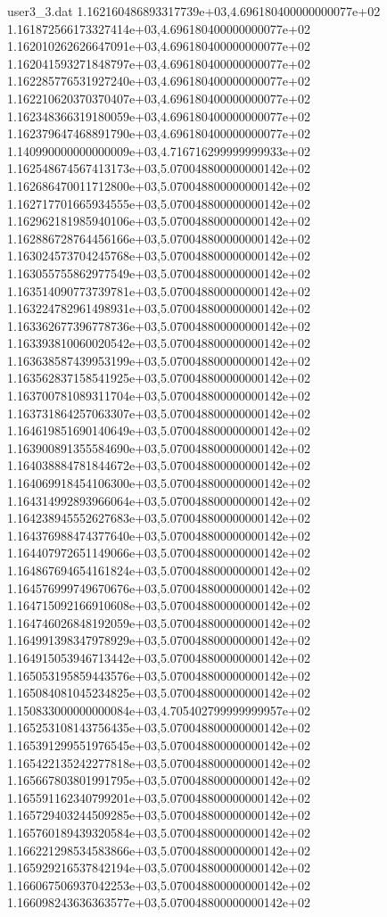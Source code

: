\begin{filecontents}{user3_3.dat}
1.162160486893317739e+03,4.696180400000000077e+02
1.161872566173327414e+03,4.696180400000000077e+02
1.162010262626647091e+03,4.696180400000000077e+02
1.162041593271848797e+03,4.696180400000000077e+02
1.162285776531927240e+03,4.696180400000000077e+02
1.162210620370370407e+03,4.696180400000000077e+02
1.162348366319180059e+03,4.696180400000000077e+02
1.162379647468891790e+03,4.696180400000000077e+02
1.140990000000000009e+03,4.716716299999999933e+02
1.162548674567413173e+03,5.070048800000000142e+02
1.162686470011712800e+03,5.070048800000000142e+02
1.162717701665934555e+03,5.070048800000000142e+02
1.162962181985940106e+03,5.070048800000000142e+02
1.162886728764456166e+03,5.070048800000000142e+02
1.163024573704245768e+03,5.070048800000000142e+02
1.163055755862977549e+03,5.070048800000000142e+02
1.163514090773739781e+03,5.070048800000000142e+02
1.163224782961498931e+03,5.070048800000000142e+02
1.163362677396778736e+03,5.070048800000000142e+02
1.163393810060020542e+03,5.070048800000000142e+02
1.163638587439953199e+03,5.070048800000000142e+02
1.163562837158541925e+03,5.070048800000000142e+02
1.163700781089311704e+03,5.070048800000000142e+02
1.163731864257063307e+03,5.070048800000000142e+02
1.164619851690140649e+03,5.070048800000000142e+02
1.163900891355584690e+03,5.070048800000000142e+02
1.164038884781844672e+03,5.070048800000000142e+02
1.164069918454106300e+03,5.070048800000000142e+02
1.164314992893966064e+03,5.070048800000000142e+02
1.164238945552627683e+03,5.070048800000000142e+02
1.164376988474377640e+03,5.070048800000000142e+02
1.164407972651149066e+03,5.070048800000000142e+02
1.164867694654161824e+03,5.070048800000000142e+02
1.164576999749670676e+03,5.070048800000000142e+02
1.164715092166910608e+03,5.070048800000000142e+02
1.164746026848192059e+03,5.070048800000000142e+02
1.164991398347978929e+03,5.070048800000000142e+02
1.164915053946713442e+03,5.070048800000000142e+02
1.165053195859443576e+03,5.070048800000000142e+02
1.165084081045234825e+03,5.070048800000000142e+02
1.150833000000000084e+03,4.705402799999999957e+02
1.165253108143756435e+03,5.070048800000000142e+02
1.165391299551976545e+03,5.070048800000000142e+02
1.165422135242277818e+03,5.070048800000000142e+02
1.165667803801991795e+03,5.070048800000000142e+02
1.165591162340799201e+03,5.070048800000000142e+02
1.165729403244509285e+03,5.070048800000000142e+02
1.165760189439320584e+03,5.070048800000000142e+02
1.166221298534583866e+03,5.070048800000000142e+02
1.165929216537842194e+03,5.070048800000000142e+02
1.166067506937042253e+03,5.070048800000000142e+02
1.166098243636363577e+03,5.070048800000000142e+02

\end{filecontents}
